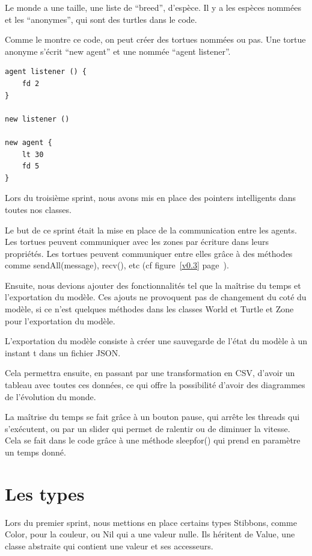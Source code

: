 Le monde a une taille, une liste de \enquote{breed}, d'espèce. Il y a les espèces nommées et les \enquote{anonymes}, qui sont des turtles dans le code.


Comme le montre ce code, on peut créer des tortues nommées ou pas. Une tortue anonyme s'écrit \enquote{new agent} et une nommée \enquote{agent listener}.\\


\begin{lstlisting}
agent listener () {
	fd 2
}

new listener ()

new agent {
	lt 30
	fd 5
}
\end{lstlisting}
Lors du troisième sprint, nous avons mis en place des pointers intelligents dans toutes nos classes.


Le but de ce sprint était la mise en place de la communication entre les agents. Les tortues peuvent communiquer avec les zones par écriture dans leurs propriétés. Les tortues peuvent communiquer entre elles grâce à des méthodes comme sendAll(message), recv(), etc 
(cf figure~\ref{v0.3} page~\pageref{v0.3}).


Ensuite, nous devions ajouter des fonctionnalités tel que la maîtrise du temps et l'exportation du modèle. Ces ajouts ne provoquent pas de changement du coté du modèle, si ce n'est quelques méthodes dans les classes World et Turtle et Zone pour l'exportation du modèle.


L'exportation du modèle consiste à créer une sauvegarde de l'état du modèle à un instant t dans un fichier JSON.


Cela permettra ensuite, en passant par une transformation en CSV, d'avoir un tableau avec toutes ces données, ce qui offre la possibilité d'avoir des diagrammes de l'évolution du monde.



La maîtrise du temps se fait grâce à un bouton pause, qui arrête les threads qui s'exécutent, ou par un slider qui permet de ralentir ou de diminuer la vitesse. Cela se fait dans le code grâce à une méthode sleepfor() qui prend en paramètre un temps donné.


\section{Les types}
Lors du premier sprint, nous mettions en place certains types Stibbons, comme Color, pour la couleur, ou Nil qui a une valeur nulle. Ils héritent de Value, une classe abstraite qui contient une valeur et ses accesseurs.


